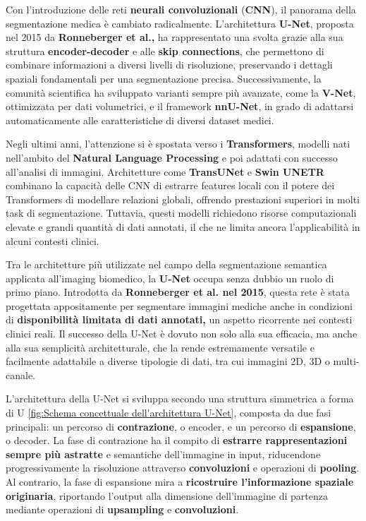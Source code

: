 Con l’introduzione delle reti \textbf{neurali convoluzionali} (\textbf{CNN}), il panorama della segmentazione medica è cambiato radicalmente. L’architettura \textbf{U-Net}, proposta nel 2015 da \textbf{Ronneberger et al.,} ha rappresentato una svolta grazie alla sua struttura \textbf{encoder-decoder} e alle \textbf{skip connections}, che permettono di combinare informazioni a diversi livelli di risoluzione, preservando i dettagli spaziali fondamentali per una segmentazione precisa. Successivamente, la comunità scientifica ha sviluppato varianti sempre più avanzate, come la \textbf{V-Net}, ottimizzata per dati volumetrici, e il framework \textbf{nnU-Net}, in grado di adattarsi automaticamente alle caratteristiche di diversi dataset medici.

Negli ultimi anni, l’attenzione si è spostata verso i \textbf{Transformers}, modelli nati nell’ambito del \textbf{Natural Language Processing} e poi adattati con successo all’analisi di immagini. Architetture come \textbf{TransUNet} e \textbf{Swin UNETR} combinano la capacità delle CNN di estrarre features locali con il potere dei Transformers di modellare relazioni globali, offrendo prestazioni superiori in molti task di segmentazione. Tuttavia, questi modelli richiedono risorse computazionali elevate e grandi quantità di dati annotati, il che ne limita ancora l’applicabilità in alcuni contesti clinici.



Tra le architetture più utilizzate nel campo della segmentazione semantica applicata all’imaging biomedico, la \textbf{U-Net} occupa senza dubbio un ruolo di primo piano. Introdotta da \textbf{Ronneberger et al. nel 2015}, questa rete è stata progettata appositamente per segmentare immagini mediche anche in condizioni di \textbf{disponibilità limitata di dati annotati,} un aspetto ricorrente nei contesti clinici reali. Il successo della U-Net è dovuto non solo alla sua efficacia, ma anche alla sua semplicità architetturale, che la rende estremamente versatile e facilmente adattabile a diverse tipologie di dati, tra cui immagini 2D, 3D o multi-canale.

L'architettura della U-Net si sviluppa secondo una struttura simmetrica a forma di U \ref{fig:Schema concettuale dell'architettura U-Net}, composta da due fasi principali: un percorso di \textbf{contrazione}, o encoder, e un percorso di \textbf{espansione}, o decoder. La fase di contrazione ha il compito di \textbf{estrarre rappresentazioni sempre più astratte} e semantiche dell’immagine in input, riducendone progressivamente la risoluzione attraverso \textbf{convoluzioni} e operazioni di \textbf{pooling}. Al contrario, la fase di espansione mira a \textbf{ricostruire l’informazione spaziale originaria}, riportando l’output alla dimensione dell’immagine di partenza mediante operazioni di \textbf{upsampling} e \textbf{convoluzioni}.

